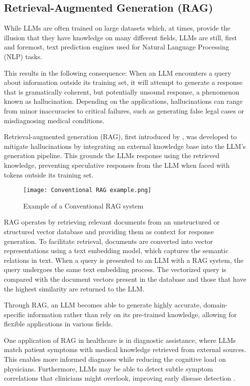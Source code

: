 \subsection{Retrieval-Augmented Generation (RAG)}
While LLMs are often trained on large datasets which, at times, provide the illusion that they have knowledge on many different fields, LLMs are still, first and foremost, text prediction engines used for Natural Language Processing (NLP) tasks.

This results in the following consequence: When an LLM encounters a query about information outside its training set, it will attempt to generate a response that is gramatically coherent, but potentially unsound response, a phenomenon known as hallucination. Depending on the applications, hallucinations can range from minor inaccuracies to critical failures, such as generating false legal cases \autocite{Bohannon_2024} or misdiagnosing medical conditions.

Retrieval-augmented generation (RAG), first introduced by \autocite{lewis2021retrievalaugmentedgenerationknowledgeintensivenlp}, was developed to mitigate hallucinations by integrating an external knowledge base into the LLM's generation pipeline. This grounds the LLMs response using the retrieved knowledge, preventing speculative responses from the LLM when faced with tokens outside its training set.

\begin{figure}
	\texttt{[image: Conventional RAG example.png]}
	\caption{Example of a Conventional RAG system}
	\centering
	\label{fig:RAGexample}
\end{figure}

RAG operates by retrieving relevant documents from an unstructured or structured vector database and providing them as context for response generation. To facilitate retrieval, documents are converted into vector representations using a text embedding model, which captures the semantic relations in text. When a query is presented to an LLM with a RAG system, the query undergoes the same text embedding process. The vectorized query is compared with the document vectors present in the database and those that have the highest similarity are returned to the LLM.

Through RAG, an LLM becomes able to generate highly accurate, domain-specific information rather than rely on its pre-trained knowledge, allowing for flexible applications in various fields.

One application of RAG in healthcare is in diagnostic assistance, where LLMs match patient symptoms with medical knowledge retrieved from external sources. This enables more informed diagnoses while reducing the cognitive load on physicians. Furthermore, LLMs may be able to detect subtle symptom correlations that clinicians might overlook, improving early disease detection \autocite{jin2024healthllmpersonalizedretrievalaugmenteddisease}.


